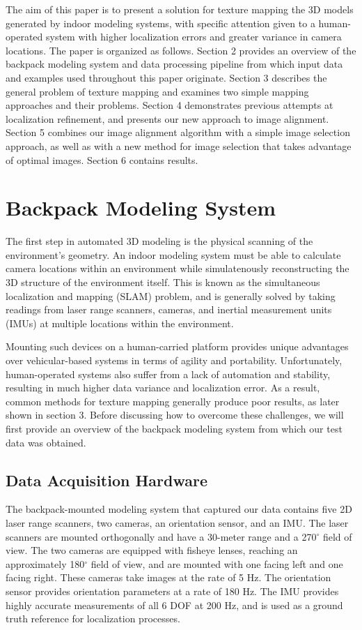 \documentclass[10pt,twocolumn,letterpaper]{article}
\begin{document}
The aim of this paper is to present a solution for texture mapping the
3D models generated by indoor modeling systems, with specific
attention given to a human-operated system with higher localization
errors and greater variance in camera locations. The paper is
organized as follows. Section 2 provides an overview of the backpack
modeling system and data processing pipeline from which input data and
examples used throughout this paper originate. Section 3 describes the
general problem of texture mapping and examines two simple mapping
approaches and their problems.  Section 4 demonstrates previous
attempts at localization refinement, and presents our new approach to
image alignment. Section 5 combines our image alignment algorithm with
a simple image selection approach, as well as with a new method for
image selection that takes advantage of optimal images. Section 6
contains results.

\section{Backpack Modeling System}
The first step in automated 3D modeling is the physical scanning of
the environment's geometry. An indoor modeling system must be able to
calculate camera locations within an environment while simulatenously
reconstructing the 3D structure of the environment itself. This is
known as the simultaneous localization and mapping (SLAM) problem, and
is generally solved by taking readings from laser range scanners,
cameras, and inertial measurement units (IMUs) at multiple locations
within the environment.

Mounting such devices on a human-carried platform provides unique
advantages over vehicular-based systems in terms of agility and
portability. Unfortunately, human-operated systems also suffer from a
lack of automation and stability, resulting in much higher data
variance and localization error. As a result, common methods for
texture mapping generally produce poor results, as later shown in
section 3. Before discussing how to overcome these challenges, we will
first provide an overview of the backpack modeling system from which
our test data was obtained.

\subsection{Data Acquisition Hardware}
The backpack-mounted modeling system that captured our data contains
five 2D laser range scanners, two cameras, an orientation sensor, and
an IMU. The laser scanners are mounted orthogonally and have a
30-meter range and a 270$^{\circ}$ field of view. The two cameras are
equipped with fisheye lenses, reaching an approximately 180$^{\circ}$
field of view, and are mounted with one facing left and one facing
right. These cameras take images at the rate of 5 Hz. The orientation
sensor provides orientation parameters at a rate of 180 Hz. The IMU
provides highly accurate measurements of all 6 DOF at 200 Hz, and is
used as a ground truth reference for localization processes.
\end{document}
